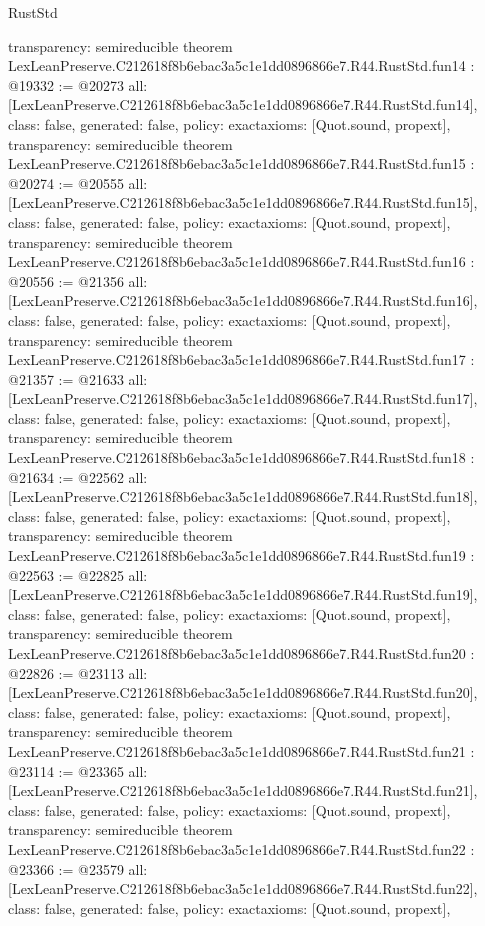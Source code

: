 \begin{lexlean}{RustStd}
\begin{coremodule}
{  transparency: semireducible
}
theorem LexLeanPreserve.C212618f8b6ebac3a5c1e1dd0896866e7.R44.RustStd.fun14 : @19332 := @20273 {
  all: [LexLeanPreserve.C212618f8b6ebac3a5c1e1dd0896866e7.R44.RustStd.fun14],
  class: false,
  generated: false,
  policy: exact{axioms: [Quot.sound, propext]},
  transparency: semireducible
}
theorem LexLeanPreserve.C212618f8b6ebac3a5c1e1dd0896866e7.R44.RustStd.fun15 : @20274 := @20555 {
  all: [LexLeanPreserve.C212618f8b6ebac3a5c1e1dd0896866e7.R44.RustStd.fun15],
  class: false,
  generated: false,
  policy: exact{axioms: [Quot.sound, propext]},
  transparency: semireducible
}
theorem LexLeanPreserve.C212618f8b6ebac3a5c1e1dd0896866e7.R44.RustStd.fun16 : @20556 := @21356 {
  all: [LexLeanPreserve.C212618f8b6ebac3a5c1e1dd0896866e7.R44.RustStd.fun16],
  class: false,
  generated: false,
  policy: exact{axioms: [Quot.sound, propext]},
  transparency: semireducible
}
theorem LexLeanPreserve.C212618f8b6ebac3a5c1e1dd0896866e7.R44.RustStd.fun17 : @21357 := @21633 {
  all: [LexLeanPreserve.C212618f8b6ebac3a5c1e1dd0896866e7.R44.RustStd.fun17],
  class: false,
  generated: false,
  policy: exact{axioms: [Quot.sound, propext]},
  transparency: semireducible
}
theorem LexLeanPreserve.C212618f8b6ebac3a5c1e1dd0896866e7.R44.RustStd.fun18 : @21634 := @22562 {
  all: [LexLeanPreserve.C212618f8b6ebac3a5c1e1dd0896866e7.R44.RustStd.fun18],
  class: false,
  generated: false,
  policy: exact{axioms: [Quot.sound, propext]},
  transparency: semireducible
}
theorem LexLeanPreserve.C212618f8b6ebac3a5c1e1dd0896866e7.R44.RustStd.fun19 : @22563 := @22825 {
  all: [LexLeanPreserve.C212618f8b6ebac3a5c1e1dd0896866e7.R44.RustStd.fun19],
  class: false,
  generated: false,
  policy: exact{axioms: [Quot.sound, propext]},
  transparency: semireducible
}
theorem LexLeanPreserve.C212618f8b6ebac3a5c1e1dd0896866e7.R44.RustStd.fun20 : @22826 := @23113 {
  all: [LexLeanPreserve.C212618f8b6ebac3a5c1e1dd0896866e7.R44.RustStd.fun20],
  class: false,
  generated: false,
  policy: exact{axioms: [Quot.sound, propext]},
  transparency: semireducible
}
theorem LexLeanPreserve.C212618f8b6ebac3a5c1e1dd0896866e7.R44.RustStd.fun21 : @23114 := @23365 {
  all: [LexLeanPreserve.C212618f8b6ebac3a5c1e1dd0896866e7.R44.RustStd.fun21],
  class: false,
  generated: false,
  policy: exact{axioms: [Quot.sound, propext]},
  transparency: semireducible
}
theorem LexLeanPreserve.C212618f8b6ebac3a5c1e1dd0896866e7.R44.RustStd.fun22 : @23366 := @23579 {
  all: [LexLeanPreserve.C212618f8b6ebac3a5c1e1dd0896866e7.R44.RustStd.fun22],
  class: false,
  generated: false,
  policy: exact{axioms: [Quot.sound, propext]},
}
\end{coremodule}
\end{lexlean}
